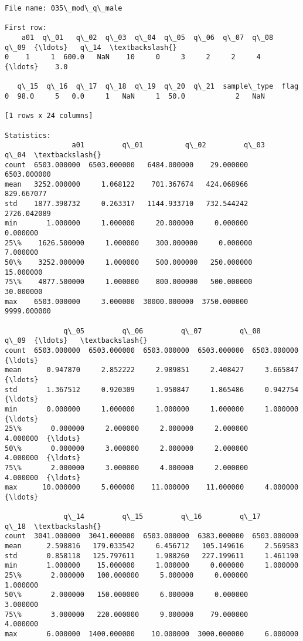 \documentclass[11pt]{article}
\begin{document}
\begin{Verbatim}[commandchars=\\\{\}]
File name: 035\_mod\_q\_male

First row: 
    a01  q\_01   q\_02  q\_03  q\_04  q\_05  q\_06  q\_07  q\_08  q\_09  {\ldots}   q\_14  \textbackslash{}
0    1     1  600.0   NaN    10     0     3     2     2     4  {\ldots}    3.0   

   q\_15  q\_16  q\_17  q\_18  q\_19  q\_20  q\_21  sample\_type  flag  
0  98.0     5   0.0     1   NaN     1  50.0            2   NaN  

[1 rows x 24 columns]

Statistics: 
                a01         q\_01          q\_02         q\_03         q\_04  \textbackslash{}
count  6503.000000  6503.000000   6484.000000    29.000000  6503.000000   
mean   3252.000000     1.068122    701.367674   424.068966   829.667077   
std    1877.398732     0.263317   1144.933710   732.544242  2726.042089   
min       1.000000     1.000000     20.000000     0.000000     0.000000   
25\%    1626.500000     1.000000    300.000000     0.000000     7.000000   
50\%    3252.000000     1.000000    500.000000   250.000000    15.000000   
75\%    4877.500000     1.000000    800.000000   500.000000    30.000000   
max    6503.000000     3.000000  30000.000000  3750.000000  9999.000000   

              q\_05         q\_06         q\_07         q\_08         q\_09  {\ldots}   \textbackslash{}
count  6503.000000  6503.000000  6503.000000  6503.000000  6503.000000  {\ldots}    
mean      0.947870     2.852222     2.989851     2.408427     3.665847  {\ldots}    
std       1.367512     0.920309     1.950847     1.865486     0.942754  {\ldots}    
min       0.000000     1.000000     1.000000     1.000000     1.000000  {\ldots}    
25\%       0.000000     2.000000     2.000000     2.000000     4.000000  {\ldots}    
50\%       0.000000     3.000000     2.000000     2.000000     4.000000  {\ldots}    
75\%       2.000000     3.000000     4.000000     2.000000     4.000000  {\ldots}    
max      10.000000     5.000000    11.000000    11.000000     4.000000  {\ldots}    

              q\_14         q\_15         q\_16         q\_17         q\_18  \textbackslash{}
count  3041.000000  3041.000000  6503.000000  6383.000000  6503.000000   
mean      2.598816   179.033542     6.456712   105.149616     2.569583   
std       0.858118   125.797611     1.988260   227.199611     1.461190   
min       1.000000    15.000000     1.000000     0.000000     1.000000   
25\%       2.000000   100.000000     5.000000     0.000000     1.000000   
50\%       2.000000   150.000000     6.000000     0.000000     3.000000   
75\%       3.000000   220.000000     9.000000    79.000000     4.000000   
max       6.000000  1400.000000    10.000000  3000.000000     6.000000   


\end{Verbatim}
\end{document}
